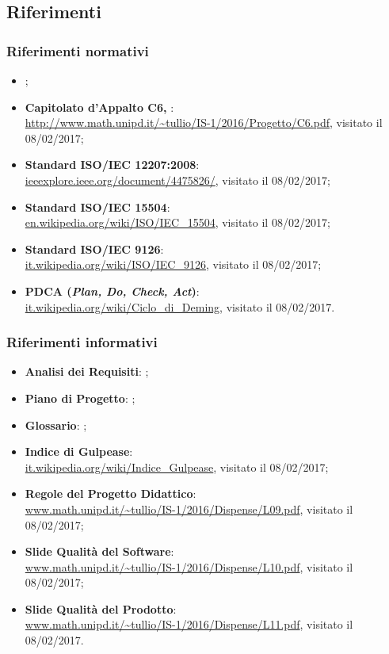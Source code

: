 	\subsection{Riferimenti}
		\subsubsection{Riferimenti normativi}
		\begin{itemize}
			\item \NdP;
			\item \textbf{Capitolato d'Appalto C6, \proj}: \\
			\url{http://www.math.unipd.it/~tullio/IS-1/2016/Progetto/C6.pdf}, visitato il 08/02/2017;
			\item \textbf{Standard ISO/IEC 12207:2008}: \\
			\url{ieeexplore.ieee.org/document/4475826/}, visitato il 08/02/2017;
			\item \textbf{Standard ISO/IEC 15504}: \\
			\url{en.wikipedia.org/wiki/ISO/IEC_15504}, visitato il 08/02/2017;
			\item \textbf{Standard ISO/IEC 9126}: \\
			\url{it.wikipedia.org/wiki/ISO/IEC_9126}, visitato il 08/02/2017;
			\item \textbf{PDCA (\emph{Plan, Do, Check, Act})}: \\
			\url{it.wikipedia.org/wiki/Ciclo_di_Deming}, visitato il 08/02/2017.
		\end{itemize}
		
		\subsubsection{Riferimenti informativi}
		\begin{itemize}
			\item \textbf{Analisi dei Requisiti}: \AdR;
			\item \textbf{Piano di Progetto}: \PdP;
			\item \textbf{Glossario}: \Glossario;
			\item \textbf{Indice di Gulpease}: \\
			\url{it.wikipedia.org/wiki/Indice_Gulpease}, visitato il 08/02/2017;
			\item \textbf{Regole del Progetto Didattico}: \\
			\url{www.math.unipd.it/~tullio/IS-1/2016/Dispense/L09.pdf}, visitato il 08/02/2017;
			\item \textbf{Slide Qualità del Software}: \\
			\url{www.math.unipd.it/~tullio/IS-1/2016/Dispense/L10.pdf}, visitato il 08/02/2017;
			\item \textbf{Slide Qualità del Prodotto}: \\
			\url{www.math.unipd.it/~tullio/IS-1/2016/Dispense/L11.pdf}, visitato il 08/02/2017.
		\end{itemize}





